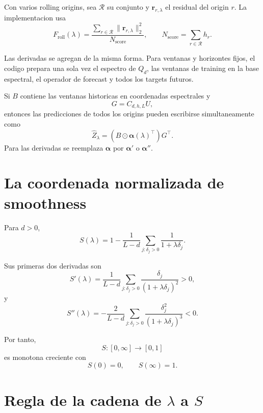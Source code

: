\documentclass[11pt]{article}
\begin{document}
Con varios rolling origins, sea \(\mathcal R\) su conjunto y
\(\bm r_{r,\lambda}\) el residual del origin \(r\). La implementacion usa
\begin{equation}
F_{\mathrm{roll}}(\lambda)
=
\frac{
\sum_{r\in\mathcal R}
\|\bm r_{r,\lambda}\|_2^2
}{
N_{\mathrm{score}}
},
\qquad
N_{\mathrm{score}}
=
\sum_{r\in\mathcal R}h_r.
\label{eq:rolling-loss}
\end{equation}

Las derivadas se agregan de la misma forma. Para ventanas y horizontes fijos,
el codigo prepara una sola vez el espectro de \(Q_d\), las ventanas de training
en la base espectral, el operador de forecast y todos los targets futuros.

Si \(B\) contiene las ventanas historicas en coordenadas espectrales y
\[
G=C_{d,h,L}U,
\]
entonces las predicciones de todos los origins pueden escribirse
simultaneamente como
\begin{equation}
\widehat Z_\lambda
=
\left(
B\odot\bm\alpha(\lambda)^\top
\right)G^\top.
\label{eq:vectorized}
\end{equation}
Para las derivadas se reemplaza \(\bm\alpha\) por
\(\bm\alpha'\) o \(\bm\alpha''\).

\section{La coordenada normalizada de smoothness}

Para \(d>0\),
\begin{equation}
S(\lambda)
=
1-
\frac{1}{L-d}
\sum_{j:\delta_j>0}
\frac{1}{1+\lambda\delta_j}.
\label{eq:smoothness}
\end{equation}

Sus primeras dos derivadas son
\begin{equation}
S'(\lambda)
=
\frac{1}{L-d}
\sum_{j:\delta_j>0}
\frac{\delta_j}
{(1+\lambda\delta_j)^2}
>0,
\label{eq:s-first}
\end{equation}
y
\begin{equation}
S''(\lambda)
=
-
\frac{2}{L-d}
\sum_{j:\delta_j>0}
\frac{\delta_j^2}
{(1+\lambda\delta_j)^3}
<0.
\label{eq:s-second}
\end{equation}

Por tanto,
\[
S:[0,\infty]\to[0,1]
\]
es monotona creciente con
\[
S(0)=0,
\qquad
S(\infty)=1.
\]

\section{Regla de la cadena de \(\lambda\) a \(S\)}
\end{document}
